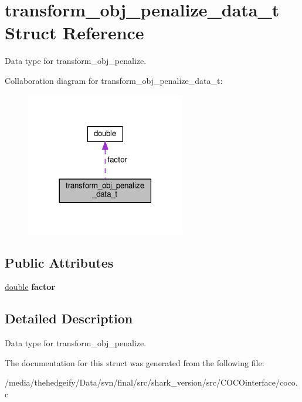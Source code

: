 \hypertarget{structtransform__obj__penalize__data__t}{}\section{transform\+\_\+obj\+\_\+penalize\+\_\+data\+\_\+t Struct Reference}
\label{structtransform__obj__penalize__data__t}


Data type for transform\+\_\+obj\+\_\+penalize.  




Collaboration diagram for transform\+\_\+obj\+\_\+penalize\+\_\+data\+\_\+t\+:\nopagebreak
\begin{figure}[H]
\begin{center}
\leavevmode
\includegraphics[width=197pt]{structtransform__obj__penalize__data__t__coll__graph}
\end{center}
\end{figure}
\subsection*{Public Attributes}
\begin{DoxyCompactItemize}
\item 
\hyperlink{classdouble}{double} {\bfseries factor}\hypertarget{structtransform__obj__penalize__data__t_a5af614937167aa134415db3a1c883fc3}{}\label{structtransform__obj__penalize__data__t_a5af614937167aa134415db3a1c883fc3}

\end{DoxyCompactItemize}


\subsection{Detailed Description}
Data type for transform\+\_\+obj\+\_\+penalize. 

The documentation for this struct was generated from the following file\+:\begin{DoxyCompactItemize}
\item 
/media/thehedgeify/\+Data/svn/final/src/shark\+\_\+version/src/\+C\+O\+C\+Ointerface/coco.\+c\end{DoxyCompactItemize}
